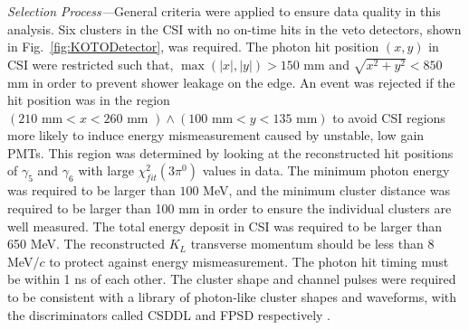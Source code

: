 \documentclass[twocolumn, superscriptaddress, aps,prl]{revtex4-2}
\begin{document}
\textit{Selection Process---}General criteria were applied to ensure data quality in this analysis. Six clusters in the CSI with no on-time hits in the veto detectors, shown in Fig.~\ref{fig:KOTODetector}, was required.  The photon hit position $(x,y)$ in CSI were restricted such that, $\max(|x|,|y|) > 150$ mm and $\sqrt{x^2+y^2} < 850$ mm in order to prevent shower leakage on the edge. An event was rejected if the hit position was in the region $(210\text{ mm}< x < 260 \text{ mm }) \wedge (100\text{ mm} < y < 135\text{ mm})$ to avoid CSI regions more likely to induce energy mismeasurement caused by unstable, low gain PMTs. This region was determined by looking at the reconstructed hit positions of $\gamma_5$ and $\gamma_6$ with large $\chi^2_{fit}(3\pi^0)$ values in data. The minimum photon energy was required to be larger than $100$ MeV, and the minimum cluster distance was required to be larger than 100 mm in order to ensure the individual clusters are well measured. The total energy deposit in CSI was required to be larger than 650 MeV. The reconstructed $K_L$ transverse momentum should be less than 8 MeV/$c$ to protect against energy mismeasurement. The photon hit timing must be within 1 ns of each other. The cluster shape and channel pulses were required to be consistent with a library of photon-like cluster shapes and waveforms, with the discriminators called CSDDL and FPSD respectively \cite{csddl_fpsd}.
\end{document}
